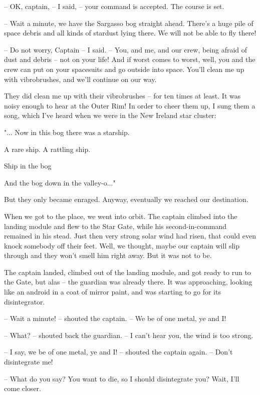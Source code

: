 \documentclass[ebook,twoside,final,openright]{memoir}
\begin{document}
– OK, captain, – I said, – your command is accepted. The course is set.\par
– Wait a minute, we have the Sargasso bog straight ahead. There's a huge pile of space debris and all kinds of stardust lying there. We will not be able to fly there!\par
– Do not worry, Captain – I said. – You, and me, and our crew, being afraid of dust and debris – not on your life! And if worst comes to worst, well, you and the crew can put on your spacesuits and go outside into space. You’ll clean me up with vibrobrushes, and we’ll continue on our way.\par
\par
They did clean me up with their vibrobrushes – for ten times at least. It was noisy enough to hear at the Outer Rim! In order to cheer them up, I sung them a song, which I’ve heard when we were in the New Ireland star cluster: \par
"... Now in this bog there was a starship.\par
A rare ship. A rattling ship.\par
Ship in the bog\par
And the bog down in the valley-o..."\par
 But they only became enraged. Anyway, eventually we reached our destination.\par
\par
When we got to the place, we went into orbit. The captain climbed into the landing module and flew to the Star Gate, while his second-in-command remained in his stead. Just then very strong solar wind had risen, that could even knock somebody off their feet. Well, we thought, maybe our captain will slip through and they won’t smell him right away. But it was not to be.\par
\par
The captain landed, climbed out of the landing module, and got ready to run to the Gate, but alas – the guardian was already there. It was approaching, looking like an android in a coat of mirror paint, and was starting to go for its disintegrator.\par
– Wait a minute! – shouted the captain. – We be of one metal, ye and I!\par
– What? – shouted back the guardian. – I can’t hear you, the wind is too strong.\par
– I say, we be of one metal, ye and I! – shouted the captain again. – Don’t disintegrate me!\par
– What do you say? You want to die, so I should disintegrate you? Wait, I'll come closer.\par
\end{document}
